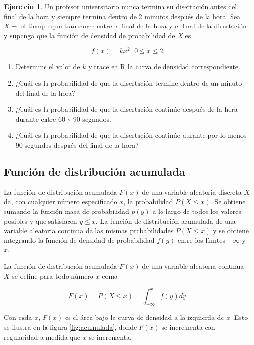 \documentclass[
  11pt,
]{book}
\theoremstyle{definition}
\theoremstyle{definition}
\theoremstyle{definition}
\newtheorem{exercise}{Ejercicio}[chapter]
\theoremstyle{definition}
\theoremstyle{remark}
\begin{document}
\begin{exercise}

Un profesor universitario nunca termina su disertación antes del final de la hora y siempre termina dentro de 2 minutos después de la hora. Sea \(X =\) el tiempo que transcurre entre el final de la hora y el final de la disertación y suponga que la función de densidad de probabilidad de \(X\) es

\[f(x) = kx^2 \text{, } 0\leq x \leq 2\]

\begin{enumerate}
\def\labelenumi{\alph{enumi}.}
\item
  Determine el valor de \(k\) y trace en R la curva de densidad correspondiente.
\item
  ¿Cuál es la probabilidad de que la disertación termine dentro de un minuto del final de la hora?
\item
  ¿Cuál es la probabilidad de que la disertación continúe después de la hora durante entre 60 y 90 segundos.
\item
  ¿Cuál es la probabilidad de que la disertación continúe durante por lo menos 90 segundos después del final de la hora?
\end{enumerate}

\end{exercise}

\subsection{Función de distribución acumulada}\label{probabilidad-variable-aleatoria-continua-fda}

La función de distribución acumulada \(F(x)\) de una variable aleatoria discreta \(X\) da, con cualquier número especificado \(x\), la probabilidad \(P(X \leq x)\). Se obtiene sumando la función masa de probabilidad \(p(y)\) a lo largo de todos los valores posibles y que satisfacen \(y \leq x\). La función de distribución acumulada de una variable aleatoria continua da las mismas probabilidades \(P(X \leq x)\) y se obtiene integrando la función de densidad de probabilidad \(f(y)\) entre los límites \(-\infty\) y \(x\).

La función de distribución acumulada \(F(x)\) de una variable aleatoria continua \(X\) se define para todo número \(x\) como

\[
F(x) =P(X\leq x) = \int_{-\infty}^xf(y)dy
\]

Con cada \(x\), \(F(x)\) es el área bajo la curva de densidad a la izquierda de \(x\). Esto se ilustra en la figura \ref{fig:acumulada}, donde \(F(x)\) se incrementa con regularidad a medida que \(x\) se incrementa.
\end{document}

